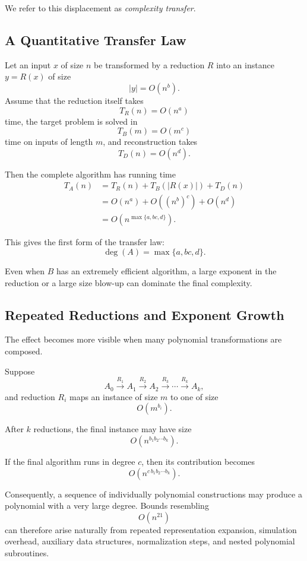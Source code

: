 \documentclass[11pt]{article}
\theoremstyle{plain}
\theoremstyle{definition}
\begin{document}
We refer to this displacement as \emph{complexity transfer}.

\subsection{A Quantitative Transfer Law}

Let an input \(x\) of size \(n\) be transformed by a reduction \(R\) into an
instance \(y=R(x)\) of size
\[
    |y| = O(n^{b}).
\]
Assume that the reduction itself takes
\[
    T_R(n)=O(n^{a})
\]
time, the target problem is solved in
\[
    T_B(m)=O(m^{c})
\]
time on inputs of length \(m\), and reconstruction takes
\[
    T_D(n)=O(n^{d}).
\]

Then the complete algorithm has running time
\[
\begin{aligned}
    T_A(n)
    &=
    T_R(n)
    +
    T_B(|R(x)|)
    +
    T_D(n)\\
    &=
    O(n^{a})
    +
    O\!\left((n^{b})^{c}\right)
    +
    O(n^{d})\\
    &=
    O\!\left(n^{\max\{a,bc,d\}}\right).
\end{aligned}
\]

This gives the first form of the transfer law:
\[
    \boxed{
    \deg(A)
    =
    \max\{a,bc,d\}.
    }
\]

Even when \(B\) has an extremely efficient algorithm, a large exponent in
the reduction or a large size blow-up can dominate the final complexity.

\subsection{Repeated Reductions and Exponent Growth}

The effect becomes more visible when many polynomial transformations are
composed.

Suppose
\[
    A_0
    \xrightarrow{R_1}
    A_1
    \xrightarrow{R_2}
    A_2
    \xrightarrow{R_3}
    \cdots
    \xrightarrow{R_k}
    A_k,
\]
and reduction \(R_i\) maps an instance of size \(m\) to one of size
\[
    O(m^{b_i}).
\]

After \(k\) reductions, the final instance may have size
\[
    O\!\left(
        n^{b_1b_2\cdots b_k}
    \right).
\]

If the final algorithm runs in degree \(c\), then its contribution becomes
\[
    O\!\left(
        n^{c\,b_1b_2\cdots b_k}
    \right).
\]

Consequently, a sequence of individually polynomial constructions may produce
a polynomial with a very large degree.  Bounds resembling
\[
    O(n^{21})
\]
can therefore arise naturally from repeated representation expansion,
simulation overhead, auxiliary data structures, normalization steps, and
nested polynomial subroutines.
\end{document}
